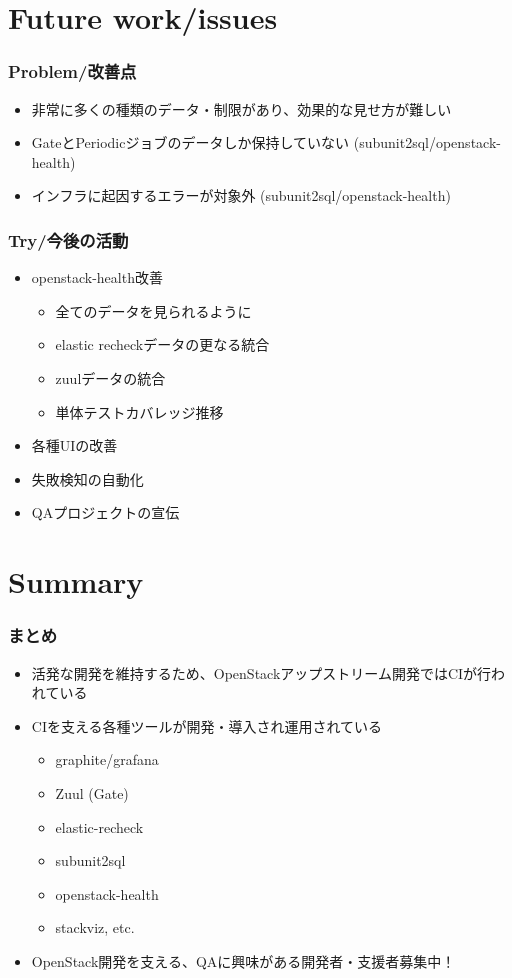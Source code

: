 \documentclass[aspectratio=169,11pt,hyperref={colorlinks=true}]{beamer}
\begin{document}
\section{Future work/issues}
\begin{frame}
  \frametitle{Problem/改善点}
  \begin{itemize}
    \item 非常に多くの種類のデータ・制限があり、効果的な見せ方が難しい
    \item GateとPeriodicジョブのデータしか保持していない (subunit2sql/openstack-health)
    \item インフラに起因するエラーが対象外 (subunit2sql/openstack-health)
  \end{itemize}
\end{frame}

\begin{frame}
  \frametitle{Try/今後の活動}
  \begin{itemize}
    \item openstack-health改善
    \begin{itemize}
      \item 全てのデータを見られるように
      \item elastic recheckデータの更なる統合
      \item zuulデータの統合
      \item 単体テストカバレッジ推移
    \end{itemize}
    \item 各種UIの改善
    \item 失敗検知の自動化
    \item QAプロジェクトの宣伝
  \end{itemize}
\end{frame}

\section{Summary}
\begin{frame}
  \frametitle{まとめ}
  \begin{itemize}
    \item 活発な開発を維持するため、OpenStackアップストリーム開発ではCIが行われている
    \item CIを支える各種ツールが開発・導入され運用されている
    \begin{itemize}
      \item graphite/grafana
      \item Zuul (Gate)
      \item elastic-recheck
      \item subunit2sql
      \item openstack-health
      \item stackviz, etc.
    \end{itemize}
    \item OpenStack開発を支える、QAに興味がある開発者・支援者募集中！
  \end{itemize}
\end{frame}
\end{document}
